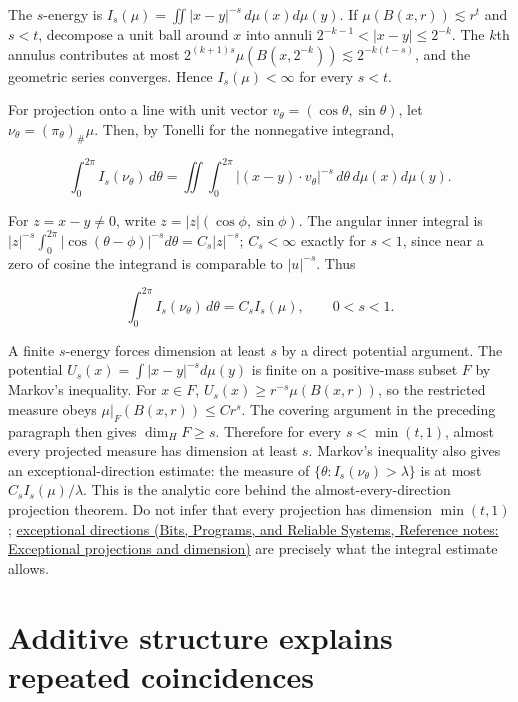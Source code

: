 The \(s\)-energy is \(I_s(\mu)=\iint|x-y|^{-s}\,d\mu(x)d\mu(y)\). If \(\mu(B(x,r))\lesssim r^t\) and \(s<t\), decompose a unit ball around \(x\) into annuli \(2^{-k-1}<|x-y|\le2^{-k}\). The \(k\)th annulus contributes at most \(2^{(k+1)s}\mu(B(x,2^{-k}))\lesssim2^{-k(t-s)}\), and the geometric series converges. Hence \(I_s(\mu)<\infty\) for every \(s<t\).

For projection onto a line with unit vector \(v_\theta=(\cos\theta,\sin\theta)\), let \(\nu_\theta=(\pi_\theta)_\#\mu\). Then, by Tonelli for the nonnegative integrand,

\[\int_0^{2\pi}I_s(\nu_\theta)\,d\theta
=\iint\int_0^{2\pi}|(x-y)\cdot v_\theta|^{-s}\,d\theta\,d\mu(x)d\mu(y).\]

For \(z=x-y\ne0\), write \(z=|z|(\cos\phi,\sin\phi)\). The angular inner integral is \(|z|^{-s}\int_0^{2\pi}|\cos(\theta-\phi)|^{-s}d\theta=C_s|z|^{-s}\); \(C_s<\infty\) exactly for \(s<1\), since near a zero of cosine the integrand is comparable to \(|u|^{-s}\). Thus

\[\int_0^{2\pi}I_s(\nu_\theta)\,d\theta=C_s I_s(\mu),\qquad 0<s<1.\]

A finite \(s\)-energy forces dimension at least \(s\) by a direct potential argument. The potential \(U_s(x)=\int|x-y|^{-s}d\mu(y)\) is finite on a positive-mass subset \(F\) by Markov's inequality. For \(x\in F\), \(U_s(x)\ge r^{-s}\mu(B(x,r))\), so the restricted measure obeys \(\mu|_F(B(x,r))\le Cr^s\). The covering argument in the preceding paragraph then gives \(\dim_H F\ge s\). Therefore for every \(s<\min(t,1)\), almost every projected measure has dimension at least \(s\). Markov's inequality also gives an exceptional-direction estimate: the measure of \(\{\theta:I_s(\nu_\theta)>\lambda\}\) is at most \(C_s I_s(\mu)/\lambda\). This is the analytic core behind the almost-every-direction projection theorem. Do not infer that every projection has dimension \(\min(t,1)\); \href{../01-Bits-Programs-and-Reliable-Systems/main.pdf\#nameddest=appendix-3c73f7862157}{exceptional directions (Bits, Programs, and Reliable Systems, Reference notes: Exceptional projections and dimension)} are precisely what the integral estimate allows.

\section{Additive structure explains repeated coincidences}\label{04-visual-computing-ii-ch033-additive-structure-explains-repeated-coincidences}

